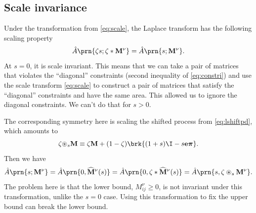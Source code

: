 \documentclass[12pt]{article}
\newcommand{\onev}{\mathbf{e}}
\newcommand{\eqm}{\pi}
\newcommand{\eq}{\boldsymbol{\eqm}}
\newcommand{\MMdm}{M}
\newcommand{\MMd}{\mathbf{\MMdm}}
\newcommand{\shift}[1]{\widehat{#1}}
\begin{document}

\subsection{Scale invariance}\label{sec:scale}

Under the transformation from \cref{eq:scale}, the Laplace transform has the following scaling property
%
\begin{equation}\label{eq:laplacescale}
  \hat{A} \prn{\zeta s;\zeta * \MMd^\nu} = \hat{A} \prn{s; \MMd^\nu}.
\end{equation}
%
At \(s = 0\), it is scale invariant.
This means that we can take a pair of matrices that violates the ``diagonal'' constraints (second inequality of \eqref{eq:constri}) and use the scale transform \eqref{eq:scale} to construct a pair of matrices that satisfy the ``diagonal'' constraints and have the same area.
This allowed us to ignore the diagonal constraints.
We can't do that for \(s > 0\).

The corresponding symmetry here is scaling the shifted process from \cref{eq:lshiftpd}, which amounts to
%
\begin{equation}\label{eq:shiftscale}
  \zeta {\circledast}_{s} \MMd 
      \equiv \zeta \MMd
      + (1 - \zeta) \brk{(1 + s)\I - s \onev \eq} .
\end{equation}
%
Then we have
%
\begin{equation}\label{eq:lshiftscale}
  \hat{A} \prn{s; \MMd^\nu} 
    = \hat{A} \prn{0, \shift{\MMd}^\nu(s)}
    = \hat{A} \prn{0, \zeta * \shift{\MMd}^\nu(s)}
    = \hat{A} \prn{s, \zeta \circledast_s \MMd^\nu}.
\end{equation}
%
The problem here is that the lower bound, \(\MMdm^\nu_{ij} \geq 0\), 
is not invariant under this transformation, unlike the \(s = 0\) case.
Using this transformation to fix the upper bound can break the lower bound.
\end{document}
